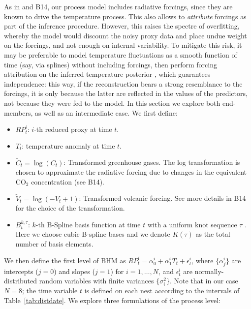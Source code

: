 \documentclass[12pt]{amsart}
\theoremstyle{plain}
\theoremstyle{definition}
\theoremstyle{remark}
\begin{document}
As in  \citet{boli1} and B14, our process model includes radiative forcings, since they are known to drive the temperature process. This also allows to {\it
  attribute} forcings \citep[i.e., determine causality,][]{HegerlZwiers:2011} as
part of the inference procedure. However, this raises the spectre of
overfitting, whereby the model would discount the noisy proxy data and place
undue weight on the forcings, and not enough on internal variability. To
mitigate this risk, it may be preferable to model temperature fluctuations as a
smooth function of time (say, via splines) without including forcings, then
perform forcing attribution on the inferred temperature posterior
\citep{Schurer2013a, Schurer2013b}, which guarantees independence: this way, if the reconstruction bears a strong resemblance to the forcings, it is only because the latter are reflected in the values of the predictors, not because they were fed to the model. In this section we explore both end-members, as well as an intermediate case. We first define:
\vspace{-.3cm}
\begin{itemize}
\item $RP_t^i$: $i$-th reduced proxy at time $t$.
  
\item $T_t$: temperature anomaly at time $t$.
  
\item $\tilde C_t = \log (C_t)$: Transformed greenhouse gases. The log
  transformation is chosen to approximate the radiative forcing due to changes
  in the equivalent CO$_2$ concentration (see B14).
  
\item $\tilde V_t = \log (-V_t+1)$: Transformed volcanic forcing. See more details in B14 for the choice of the transformation.
  
\item $B_t^{k,\tau}$: $k$-th B-Spline basis function at time $t$ with a uniform knot
  sequence $\tau$ \citep{DeBoor2001,Ramsay2005}. Here we choose
  cubic B-spline bases and we denote $K(\tau)$ as the total number of basis elements.  
\end{itemize}
We then define the first level of BHM as $RP_t^i=\alpha_0^i+\alpha_1^iT_t+\epsilon^i_t$,  
where $\{\alpha^i_j\}$ are intercepts ($j=0$) and slopes ($j=1$) for $i=1,\ldots,N$,  and $\epsilon^i_t$ are normally-distributed random variables with finite variances
$\{\sigma^2_i\}$. Note that in our case $N=8$; the time variable $t$ is defined on each nest according to the
intervals of Table~\ref{tab:distdate}. We explore three formulations of the process level:
\end{document}
